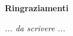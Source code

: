\thispagestyle{empty}

\begin{center}
  {\bf \Huge Ringraziamenti}
\end{center}

\vspace{4cm}


\emph{
  ... da scrivere ...
}

